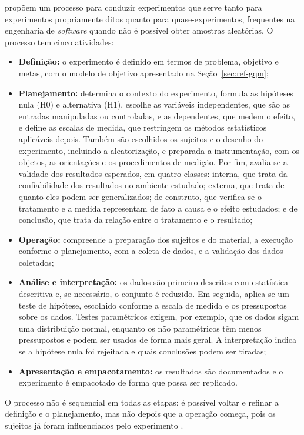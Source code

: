  propõem um processo para conduzir experimentos que serve tanto para experimentos propriamente ditos quanto para quase-experimentos, frequentes na engenharia de \textit{software} quando não é possível obter amostras aleatórias. O processo tem cinco atividades:

\begin{itemize}
  \item \textbf{Definição:} o experimento é definido em termos de problema, objetivo e metas, com o modelo de objetivo apresentado na Seção~\ref{sec:ref-gqm};
  \item \textbf{Planejamento:} determina o contexto do experimento, formula as hipóteses nula (H0) e alternativa (H1), escolhe as variáveis independentes, que são as entradas manipuladas ou controladas, e as dependentes, que medem o efeito, e define as escalas de medida, que restringem os métodos estatísticos aplicáveis depois. Também são escolhidos os sujeitos e o desenho do experimento, incluindo a aleatorização, e preparada a instrumentação, com os objetos, as orientações e os procedimentos de medição. Por fim, avalia-se a validade dos resultados esperados, em quatro classes: interna, que trata da confiabilidade dos resultados no ambiente estudado; externa, que trata de quanto eles podem ser generalizados; de construto, que verifica se o tratamento e a medida representam de fato a causa e o efeito estudados; e de conclusão, que trata da relação entre o tratamento e o resultado;
  \item \textbf{Operação:} compreende a preparação dos sujeitos e do material, a execução conforme o planejamento, com a coleta de dados, e a validação dos dados coletados;
  \item \textbf{Análise e interpretação:} os dados são primeiro descritos com estatística descritiva e, se necessário, o conjunto é reduzido. Em seguida, aplica-se um teste de hipótese, escolhido conforme a escala de medida e os pressupostos sobre os dados. Testes paramétricos exigem, por exemplo, que os dados sigam uma distribuição normal, enquanto os não paramétricos têm menos pressupostos e podem ser usados de forma mais geral. A interpretação indica se a hipótese nula foi rejeitada e quais conclusões podem ser tiradas;
  \item \textbf{Apresentação e empacotamento:} os resultados são documentados e o experimento é empacotado de forma que possa ser replicado.
\end{itemize}

O processo não é sequencial em todas as etapas: é possível voltar e refinar a definição e o planejamento, mas não depois que a operação começa, pois os sujeitos já foram influenciados pelo experimento \cite{wohlin2000}.

